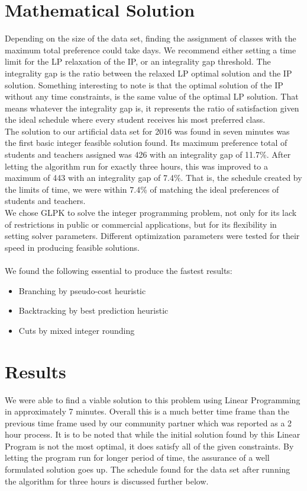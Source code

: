 \documentclass[11pt]{article}
\begin{document}
\section{Mathematical Solution}
\indent Depending on the size of the data set, finding the assignment of classes with the maximum total preference could take days. We recommend either setting a time limit for the LP relaxation of the IP, or an integrality gap threshold. The integrality gap is the ratio between the relaxed LP optimal solution and the IP solution. Something interesting to note is that the optimal solution of the IP without any time constraints, is the same value of the optimal LP solution. That means whatever the integrality gap is, it represents the ratio of satisfaction given the ideal schedule where every student receives his most preferred class.\\
\indent The solution to our artificial data set for 2016 was found in seven minutes was the first basic integer feasible solution found. Its maximum preference total of students and teachers assigned was 426 with an integrality gap of 11.7\%.  After letting the algorithm run for exactly three hours, this was improved to a maximum of 443 with an integrality gap of 7.4\%. That is, the schedule created by the limits of time, we were within 7.4\% of matching the ideal preferences of students and teachers.\\
\indent We chose GLPK to solve the integer programming problem, not only for its lack of restrictions in public or commercial applications, but for its flexibility in setting solver parameters. Different optimization parameters were tested for their speed in producing feasible solutions.\\\\
We found the following essential to produce the fastest results:
\begin{itemize}
	\item Branching by pseudo-cost heuristic
	\item Backtracking by best prediction heuristic
	\item Cuts by mixed integer rounding
\end{itemize}
\section{Results}
We were able to find a viable solution to this problem using Linear Programming in approximately 7 minutes. Overall this is a much better time frame than the previous time frame used by our community partner which was reported as a 2 hour process. It is to be noted that while the initial solution found by this Linear Program is not the most optimal, it does satisfy all of the given constraints. By letting the program run for longer period of time, the assurance of a well formulated solution goes up. The schedule found for the data set after running the algorithm for three hours is discussed further below.\\
\end{document}
